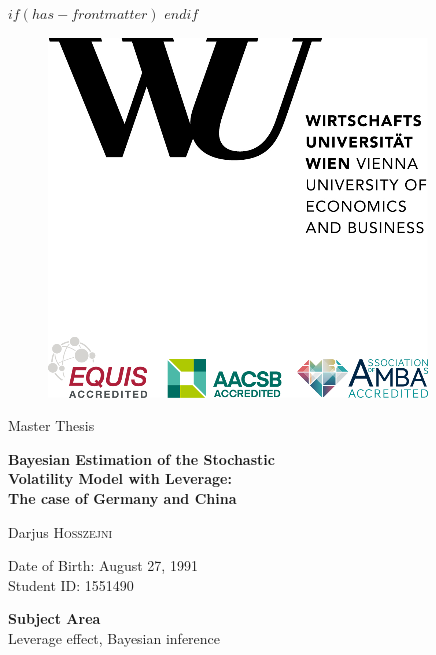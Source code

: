 $if(has-frontmatter)$
\frontmatter
$endif$


\thispagestyle{empty}
\begin{figure}[h!]
    \raggedleft
    \includegraphics[scale=0.9]{pictures/WULogo.png}
\end{figure}

\vspace{1em}


\raggedright

{\large Master Thesis\par}

\vspace{1cm}

{\huge\bfseries Bayesian Estimation of the Stochastic\\
Volatility Model with Leverage:\\
The case of Germany and China\par}

\vspace{0.5cm}

{\huge Darjus \textsc{Hosszejni}\par}

\vspace{0.5cm}
Date of Birth: August 27, 1991\\
Student ID: 1551490

\vspace{1cm}
\textbf{Subject Area}\\
Leverage effect, Bayesian inference

